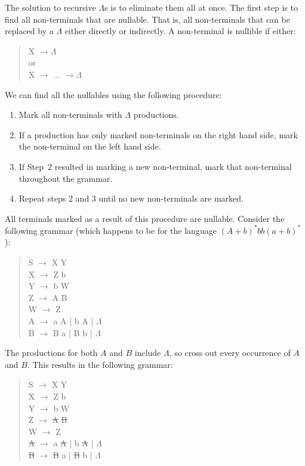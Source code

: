 \documentclass[letterpaper,12pt,openany,reqno]{book}%
\begin{document}
The solution to recursive $\Lambda$s is to eliminate them all at once. The first step is to find all non-terminals that are nullable. That is, all non-terminals that can be replaced by a $\Lambda$ either directly or indirectly. A non-terminal is nullible if either:
\begin{quote}
{\ttfamily X} $\rightarrow \Lambda$\\
or\\
{\ttfamily X} $\rightarrow$ ... $\rightarrow \Lambda$\\
\end{quote}

We can find all the nullables using the following procedure:
\begin{enumerate}
\item Mark all non-terminals with $\Lambda$ productions.
\item If a production has only marked non-terminals on the right hand side, mark the non-terminal on the left hand side.
\item If Step~2 resulted in marking a new non-terminal, mark that non-terminal throughout the grammar.
\item Repeat steps 2 and 3 until no new non-terminals are marked.
\end{enumerate}
All terminals marked as a result of this procedure are nullable. Consider the following grammar (which happens to be for the language $(A+b)^*bb(a+b)^*$):
\begin{quote}
{\ttfamily S} $\rightarrow$ {\ttfamily X Y}\\
{\ttfamily X} $\rightarrow$ {\ttfamily Z b}\\
{\ttfamily Y} $\rightarrow$ {\ttfamily b W}\\
{\ttfamily Z} $\rightarrow$ {\ttfamily A B}\\
{\ttfamily W} $\rightarrow$ {\ttfamily Z}\\
{\ttfamily A} $\rightarrow$ {\ttfamily a A | b A | $\Lambda$}\\
{\ttfamily B} $\rightarrow$ {\ttfamily B a | B b | $\Lambda$}\\
\end{quote}
The productions for both $A$ and $B$ include $\Lambda$, so cross out every occurrence of $A$ and $B$. This results in the following grammar:
\begin{quote}
{\ttfamily S} $\rightarrow$ {\ttfamily X Y}\\
{\ttfamily X} $\rightarrow$ {\ttfamily Z b}\\
{\ttfamily Y} $\rightarrow$ {\ttfamily b W}\\
{\ttfamily Z} $\rightarrow$ {\ttfamily \sout{A} \sout{B}}\\
{\ttfamily W} $\rightarrow$ {\ttfamily Z}\\
{\ttfamily \sout{A}} $\rightarrow$ {\ttfamily a \sout{A} | b \sout{A} | $\Lambda$}\\
{\ttfamily \sout{B}} $\rightarrow$ {\ttfamily \sout{B} a | \sout{B} b | $\Lambda$}\\
\end{quote}
\end{document}
